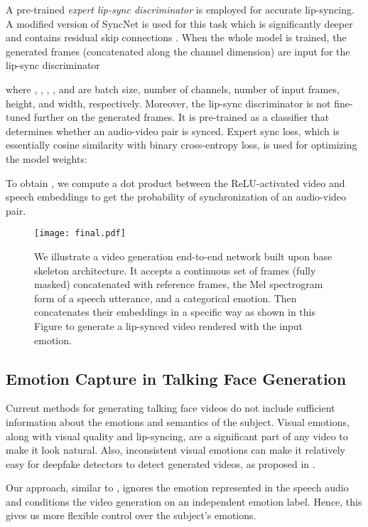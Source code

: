 \documentclass[accepted]{uai2023}
\begin{document}
A pre-trained \emph{expert lip-sync discriminator} is employed for accurate lip-syncing. A modified version of SyncNet \citep{chung2016out} is used for this task which is significantly deeper and contains residual skip connections \citep{he2016deep}.
When the whole model is trained, the generated frames (concatenated along the channel dimension) are input for the lip-sync discriminator 

where , , , , and  are batch size, number of channels, number of input frames, height, and width, respectively. Moreover, the lip-sync discriminator is not fine-tuned further on the generated frames. It is pre-trained as a classifier that determines whether an audio-video pair is synced.  Expert sync loss, which is essentially cosine similarity with binary cross-entropy loss, is used for optimizing the model weights:

To obtain , we compute a dot product between the ReLU-activated video and speech embeddings  to get the probability of synchronization of an audio-video pair.


\begin{figure*}[t]
\texttt{[image: final.pdf]}
\caption{We illustrate a video generation end-to-end network built upon base skeleton architecture. It accepts a continuous set of frames (fully masked) concatenated with reference frames, the Mel spectrogram form of a speech utterance, and a categorical emotion. Then concatenates their embeddings in a specific way as shown in this Figure to generate a lip-synced video rendered with the input emotion.}
\label{fig:main_model}
\end{figure*}



\subsection{Emotion Capture in Talking Face Generation}
Current methods for generating talking face videos do not include sufficient information about the emotions and semantics of the subject. Visual emotions, along with visual quality and lip-syncing, are a significant part of any video to make it look natural. 
Also, inconsistent visual emotions can make it relatively easy for deepfake detectors to detect generated videos, as proposed in \citep{hosler2021deepfakes}.

Our approach, similar to \citep{9496264, Ji_2021_CVPR, sinha2022emotion}, ignores the emotion represented in the speech audio and conditions the video generation on an independent emotion label. Hence, this gives us more flexible control over the subject's emotions.
\end{document}
